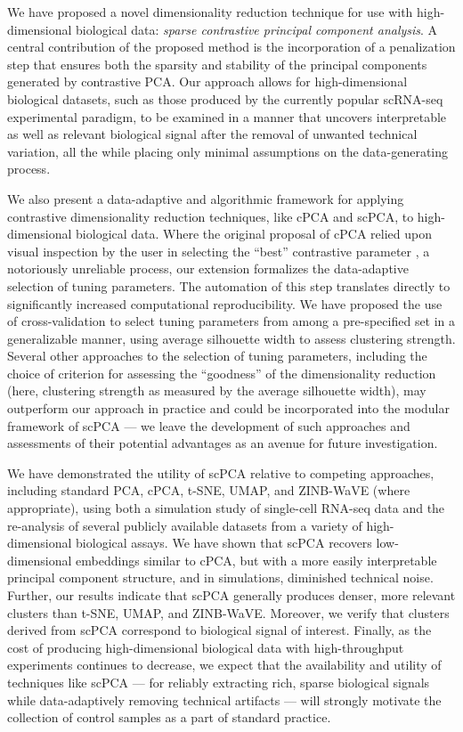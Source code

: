 We have proposed a novel dimensionality reduction technique for use with high-dimensional biological data: \textit{sparse contrastive principal component analysis}. A central contribution of the proposed method is the incorporation of a penalization step that ensures both the sparsity and stability of the principal components generated by contrastive PCA. Our approach allows for high-dimensional biological datasets, such as those produced by the currently popular scRNA-seq experimental paradigm, to be examined in a manner that uncovers interpretable as well as relevant biological signal after the removal of unwanted technical variation, all the while placing only minimal assumptions on the data-generating process.

We also present a data-adaptive and algorithmic framework for applying contrastive dimensionality reduction techniques, like cPCA and scPCA, to high-dimensional biological data. Where the original proposal of cPCA relied upon visual inspection by the user in selecting the ``best'' contrastive parameter \cite{Abid2018}, a notoriously unreliable process, our extension formalizes the data-adaptive selection of tuning parameters. The automation of this step translates directly to significantly increased computational reproducibility. We have proposed the use of cross-validation to select tuning parameters from among a pre-specified set in a generalizable manner, using average silhouette width to assess clustering strength. Several other approaches to the selection of tuning parameters, including the choice of criterion for assessing the ``goodness'' of the dimensionality reduction (here, clustering strength as measured by the average silhouette width), may outperform our approach in practice and could be incorporated into the modular framework of scPCA --- we leave the development of such approaches and assessments of their potential advantages as an avenue for future investigation.

We have demonstrated the utility of scPCA relative to competing approaches, including standard PCA, cPCA, t-SNE, UMAP, and ZINB-WaVE (where appropriate), using both a simulation study of single-cell RNA-seq data and the re-analysis of several publicly available datasets from a variety of high-dimensional biological assays. We have shown that scPCA recovers low-dimensional embeddings similar to cPCA, but with a more easily interpretable principal component structure, and in simulations, diminished technical noise. Further, our results indicate that scPCA generally produces denser, more relevant clusters than t-SNE, UMAP, and ZINB-WaVE. Moreover, we verify that clusters derived from scPCA correspond to biological signal of interest. Finally, as the cost of producing high-dimensional biological data with high-throughput experiments continues to decrease, we expect that the availability and utility of techniques like scPCA --- for reliably extracting rich, sparse biological signals while data-adaptively removing technical artifacts --- will strongly motivate the collection of control samples as a part of standard practice.